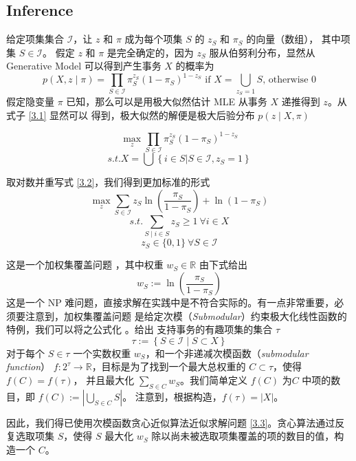 \documentclass{ctexart}
\newcommand{\scri}[0]{\mathcal{I}}
\begin{document}
\subsection{Inference}

给定项集集合 $\scri$，让 $z$ 和 $\pi$ 成为每个项集 $S$ 的 $z_S$ 和 $\pi_S$ 的向量（数组），
其中项集 $S \in \scri$。
假定 $z$ 和 $\pi$ 是完全确定的，因为 $z_S$ 服从伯努利分布，显然从 Generative Model 可以得到产生事务 $X$ 的概率为
\begin{equation}
\label{3.1}
p(X, z \mid \pi) = \prod_{S \in \scri} \pi_S^{z_S} (1 - \pi_S)^{1 - z_S}
\text{ if } X = \bigcup_{z_S = 1} S \text{, otherwise } 0
\end{equation}
假定隐变量  $\pi$ 已知，那么可以是用极大似然估计 MLE 从事务 $X$ 递推得到 $z$。从式子 \ref{3.1} 显然可以
得到，极大似然的解便是极大后验分布 $p(z \mid X, \pi)$

\begin{equation}
\label{3.2}
\max_z \prod_{S \in \scri} \pi_S^{z_S} (1 - \pi_S)^{1 - z_S}
\end{equation}
$$
s.t. X = \bigcup \left\{ i \in S | S \in \scri, z_S = 1 \right\}
$$

取对数并重写式 \ref{3.2}，我们得到更加标准的形式
\begin{equation}
\label{3.3}
\max_z \sum_{S \in \scri} z_S \ln \left( \frac{\pi_S}{1 - \pi_S} \right) + \ln \left(1 - \pi_S \right)
\end{equation}
$$
s.t. \sum_{S \mid i \in S} z_S \geq 1 \ \forall i \in X
$$
$$
z_S \in \{0, 1\} \ \forall S \in \scri
$$

这是一个加权集覆盖问题 \cite{weighted-set-cover}，其中权重 $w_S \in \mathbb{R} $ 由下式给出
$$
w_S := \ln\left( \frac{\pi_S}{1 - \pi_S} \right)
$$
这是一个 NP 难问题，直接求解在实践中是不符合实际的。有一点非常重要，必须要注意到，加权集覆盖问题
是给定次模（\textit{Submodular}）约束极大化线性函数的特例，我们可以将之公式化 \cite{young}。给出
支持事务的有趣项集的集合 $\tau$
\begin{equation}
\label{3.4}
\tau := \left\{ S \in \scri \mid S \subset X \right\}
\end{equation}
对于每个 $S \in \tau$ 一个实数权重 $w_S$，和一个非递减次模函数（\textit{submodular function}）
$f: 2^\tau \to \mathbb{R}$，目标是为了找到一个最大总权重的 $C \subset \tau$，使得 $f(C) = f(\tau)$，
并且最大化 $\sum_{S \in C} w_S$。我们简单定义 $f(C)$ 为$C$ 中项的数目，即 $f(C) := | \bigcup_{S \in C} S |$。
注意到，根据构造，$f(\tau) = | X | $。

因此，我们得已使用次模函数贪心近似算法近似求解问题 \ref{3.3}。贪心算法通过反复选取项集 $S$，使得
$S$ 最大化 $w_S$ 除以尚未被选取项集覆盖的项的数目的值，构造一个 $C$。
\end{document}
